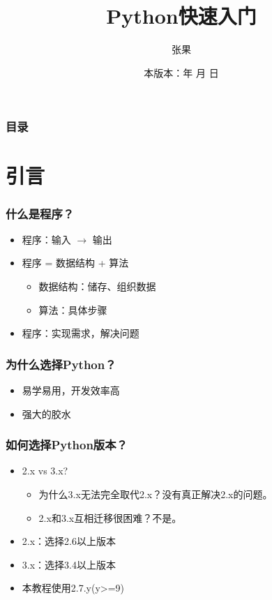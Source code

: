 \documentclass[13pt]{beamer}
\begin{document}
\title{Python快速入门}
\author{张果}
\renewcommand{\today}{\number\year 年 \number\month 月 \number\day 日}
\date{本版本：\today}
\subject{Lectures}


\begin{frame}
\titlepage
\end{frame}

\begin{frame}[plain]
\frametitle{目录}
\begin{multicols}{2}
\tableofcontents
\end{multicols}
\end{frame}

\section{引言}
\begin{frame}
\frametitle{什么是程序？}
\begin{itemize}
  \item 程序：输入 $\to$ 输出
  \item 程序 = 数据结构 + 算法
  \begin{itemize}
    \item 数据结构：储存、组织数据
    \item 算法：具体步骤
  \end{itemize}
  \item 程序：实现需求，解决问题
\end{itemize}
\end{frame}

\begin{frame}
\frametitle{为什么选择Python？}
\begin{itemize}
\item 易学易用，开发效率高
\item 强大的胶水
\end{itemize}
\end{frame}

\begin{frame}
\frametitle{如何选择Python版本？}
\begin{itemize}
\item 2.x vs 3.x?
\begin{itemize}
\item 为什么3.x无法完全取代2.x？没有真正解决2.x的问题。
\item 2.x和3.x互相迁移很困难？不是。
\end{itemize}
\item 2.x：选择2.6以上版本
\item 3.x：选择3.4以上版本
\item 本教程使用2.7.y(y>=9)
\end{itemize}
\end{frame}
\end{document}
